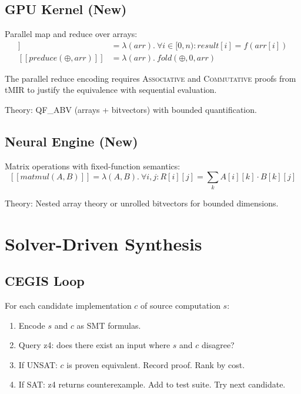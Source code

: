 \documentclass[11pt,twocolumn]{article}
\begin{document}
\subsection{GPU Kernel (New)}

Parallel map and reduce over arrays:
\begin{align*}
[\![ \mathit{pmap}(f, \mathit{arr}) ]\!] &= \lambda(\mathit{arr}).\ \forall i \in [0, n): \mathit{result}[i] = f(\mathit{arr}[i]) \\
[\![ \mathit{preduce}(\oplus, \mathit{arr}) ]\!] &= \lambda(\mathit{arr}).\ \mathit{fold}(\oplus, 0, \mathit{arr})
\end{align*}

The parallel reduce encoding requires \textsc{Associative} and \textsc{Commutative} proofs from tMIR to justify the equivalence with sequential evaluation.

Theory: QF\_ABV (arrays + bitvectors) with bounded quantification.

\subsection{Neural Engine (New)}

Matrix operations with fixed-function semantics:
\[
[\![ \mathit{matmul}(A, B) ]\!] = \lambda(A, B).\ \forall i,j: R[i][j] = \textstyle\sum_k A[i][k] \cdot B[k][j]
\]

Theory: Nested array theory or unrolled bitvectors for bounded dimensions.

\section{Solver-Driven Synthesis}

\subsection{CEGIS Loop}

For each candidate implementation $c$ of source computation $s$:

\begin{enumerate}[leftmargin=*,topsep=4pt,itemsep=2pt]
\item Encode $s$ and $c$ as SMT formulas.
\item Query z4: does there exist an input where $s$ and $c$ disagree?
\item If UNSAT: $c$ is proven equivalent. Record proof. Rank by cost.
\item If SAT: z4 returns counterexample. Add to test suite. Try next candidate.
\end{enumerate}
\end{document}
